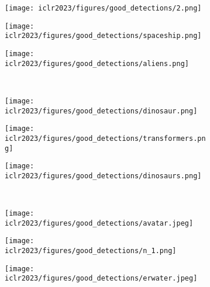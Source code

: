 \documentclass{article} \usepackage{iclr2023_conference,times}
\begin{document}
\begin{figure}
     \centering

     \begin{subfigure}[b]{0.31\textwidth}
         \centering
         \texttt{[image: iclr2023/figures/good\_detections/2.png]}
\label{fig:five over x}
     \end{subfigure} 
     \begin{subfigure}[b]{0.31\textwidth}
         \centering
         \texttt{[image: iclr2023/figures/good\_detections/spaceship.png]}
\label{fig:three sin x}
     \end{subfigure}
     \begin{subfigure}[b]{0.3\textwidth}
         \centering
         \texttt{[image: iclr2023/figures/good\_detections/aliens.png]}
\label{fig:five over x}
     \end{subfigure} 
     \\
     \begin{subfigure}[b]{0.31\textwidth}
         \centering
         \texttt{[image: iclr2023/figures/good\_detections/dinosaur.png]}
\label{fig:three sin x}
     \end{subfigure}
     \begin{subfigure}[b]{0.31\textwidth}
         \centering
         \texttt{[image: iclr2023/figures/good\_detections/transformers.png]}
\label{fig:three sin x}
     \end{subfigure}
     \begin{subfigure}[b]{0.31\textwidth}
         \centering
         \texttt{[image: iclr2023/figures/good\_detections/dinosaurs.png]}
\label{fig:five over x}
     \end{subfigure} 
     \\
     \begin{subfigure}[b]{0.33\textwidth}
         \centering
         \texttt{[image: iclr2023/figures/good\_detections/avatar.jpeg]}
\label{fig:three sin x}
     \end{subfigure}
     \begin{subfigure}[b]{0.31\textwidth}
         \centering
         \texttt{[image: iclr2023/figures/good\_detections/n\_1.png]}
\label{fig:five over x}
     \end{subfigure} 
     \begin{subfigure}[b]{0.28\textwidth}
         \centering
         \texttt{[image: iclr2023/figures/good\_detections/erwater.jpeg]}

\end{subfigure}
\end{figure}
\end{document}
